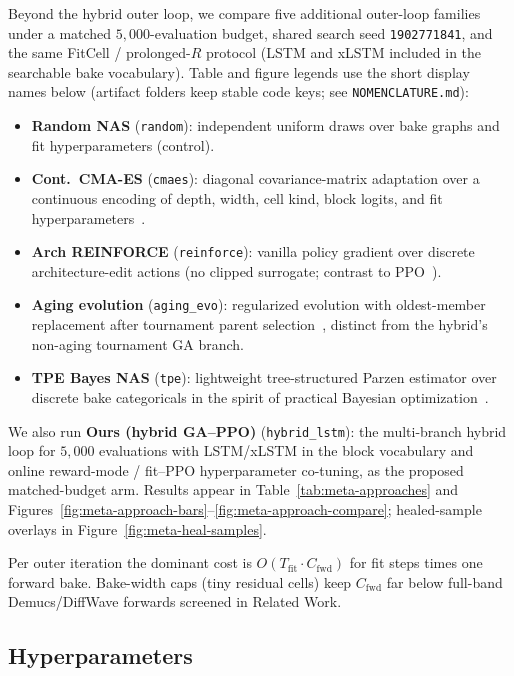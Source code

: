 Beyond the hybrid outer loop, we compare five additional outer-loop families under a matched $5{,}000$-evaluation budget, shared search seed \texttt{1902771841}, and the same FitCell / prolonged-$R$ protocol (LSTM and xLSTM included in the searchable bake vocabulary).
Table and figure legends use the short display names below (artifact folders keep stable code keys; see \texttt{NOMENCLATURE.md}):
\begin{itemize}
  \item \textbf{Random NAS} (\texttt{random}): independent uniform draws over bake graphs and fit hyperparameters (control).
  \item \textbf{Cont.\ CMA-ES} (\texttt{cmaes}): diagonal covariance-matrix adaptation over a continuous encoding of depth, width, cell kind, block logits, and fit hyperparameters~\cite{hansen2016cmaes}.
  \item \textbf{Arch REINFORCE} (\texttt{reinforce}): vanilla policy gradient over discrete architecture-edit actions (no clipped surrogate; contrast to PPO~\cite{schulman2017,zoph2017nas}).
  \item \textbf{Aging evolution} (\texttt{aging\_evo}): regularized evolution with oldest-member replacement after tournament parent selection~\cite{real2017large,real2019}, distinct from the hybrid's non-aging tournament GA branch.
  \item \textbf{TPE Bayes NAS} (\texttt{tpe}): lightweight tree-structured Parzen estimator over discrete bake categoricals in the spirit of practical Bayesian optimization~\cite{snoek2012}.
\end{itemize}
We also run \textbf{Ours (hybrid GA--PPO)} (\texttt{hybrid\_lstm}): the multi-branch hybrid loop for $5{,}000$ evaluations with LSTM/xLSTM in the block vocabulary and online reward-mode / fit--PPO hyperparameter co-tuning, as the proposed matched-budget arm.
Results appear in Table~\ref{tab:meta-approaches} and Figures~\ref{fig:meta-approach-bars}--\ref{fig:meta-approach-compare}; healed-sample overlays in Figure~\ref{fig:meta-heal-samples}.

\begin{remark}
\label{rem:complexity}
Per outer iteration the dominant cost is $O(T_{\mathrm{fit}}\cdot C_{\mathrm{fwd}})$ for fit steps times one forward bake.
Bake-width caps (tiny residual cells) keep $C_{\mathrm{fwd}}$ far below full-band Demucs/DiffWave forwards screened in Related Work.
\end{remark}

\subsection{Hyperparameters}
\label{sec:hyperparams}

